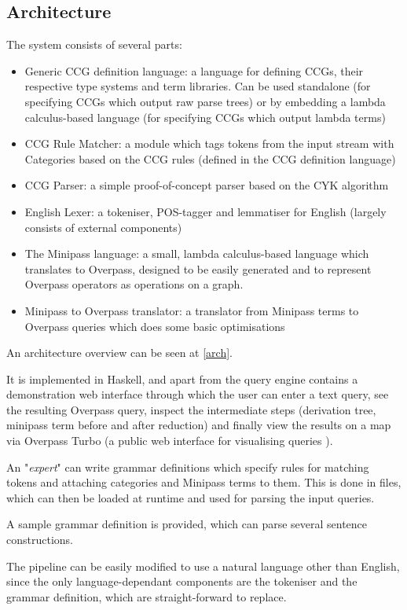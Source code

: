 \documentclass[main.tex]{subfiles}
\begin{document}
\subsection{Architecture}
The system consists of several parts:


\begin{itemize}
    \item Generic CCG definition language: a language for defining CCGs,
          their respective type systems and term libraries. Can be used
          standalone (for specifying CCGs which output raw parse trees)
          or by embedding a lambda calculus-based language (for specifying
          CCGs which output lambda terms)

    \item CCG Rule Matcher: a module which tags tokens from the input stream
          with Categories based on the CCG rules (defined in the CCG definition
          language)

    \item CCG Parser: a simple proof-of-concept parser based on the CYK
          algorithm

    \item English Lexer: a tokeniser, POS-tagger and lemmatiser for English
          (largely consists of external components)

    \item The Minipass language: a small, lambda calculus-based language
          which translates to Overpass, designed to be easily generated and
          to represent Overpass operators as operations on a graph.

    \item Minipass to Overpass translator: a translator from Minipass terms
          to Overpass queries which does some basic optimisations
\end{itemize}

An architecture overview can be seen at \cref{arch}.

It is implemented in Haskell, and apart from the query engine contains
a demonstration web interface through which the user can enter a text query,
see the resulting Overpass query, inspect the intermediate steps (derivation
tree, minipass term before and after reduction) and finally view the results
on a map via Overpass Turbo (a public web interface for visualising queries
\cite{overpassturbo}).

An "\emph{expert}" can write grammar definitions which specify rules for matching
tokens and attaching categories and Minipass terms to them. This is done in
 files, which can then be loaded at runtime and used for parsing the
input queries.

A sample grammar definition is provided, which can parse several sentence
constructions.

The pipeline can be easily modified to use a natural language other than
English, since the only language-dependant components are the tokeniser and
the grammar definition, which are straight-forward to replace.
\end{document}
